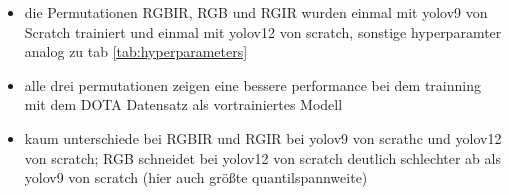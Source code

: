 \begin{itemize}
    \item die Permutationen RGBIR, RGB und RGIR wurden einmal mit yolov9 von Scratch trainiert und einmal mit yolov12 von scratch, sonstige hyperparamter analog zu tab \ref{tab:hyperparameters}
    \item alle drei permutationen zeigen eine bessere performance bei dem trainning mit dem DOTA Datensatz als vortrainiertes Modell
    \item kaum unterschiede bei RGBIR und RGIR bei yolov9 von scrathc und yolov12 von scratch; RGB schneidet bei yolov12 von scratch deutlich schlechter ab als yolov9 von scratch (hier auch größte quantilspannweite)
\end{itemize}